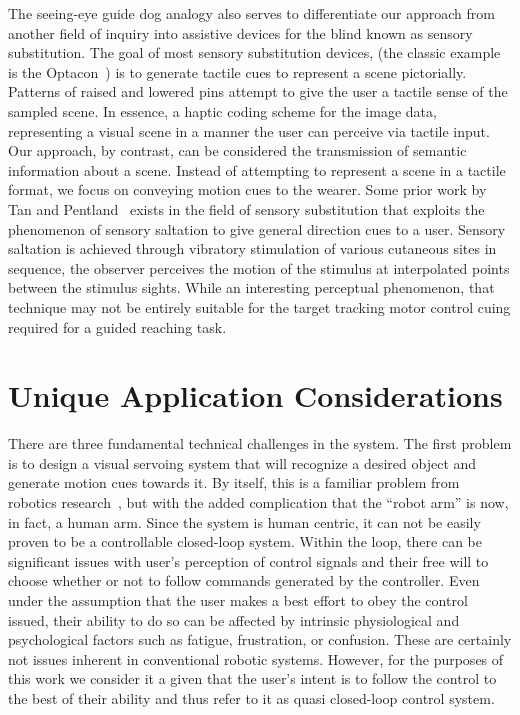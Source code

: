 The seeing-eye guide dog analogy also serves to differentiate our approach from another field of inquiry into assistive devices for the blind known as sensory substitution.  The goal of most sensory substitution devices, (the classic example is the Optacon~\cite{Bib:Linvill}) is to generate tactile cues to represent a scene pictorially.  Patterns of raised and lowered pins attempt to give the user a tactile sense of the sampled scene.  In essence, a haptic coding scheme for the image data, representing a visual scene in a manner the user can perceive via tactile input.  Our approach, by contrast, can be considered the transmission of semantic information about a scene. Instead of attempting to represent a scene in a tactile format, we focus on conveying motion cues to the wearer.  Some prior work by Tan and Pentland~\cite{TAN97, TAN05} exists in the field of sensory substitution that exploits the phenomenon of sensory saltation to give general direction cues to a user. Sensory saltation is achieved through vibratory stimulation of various cutaneous sites in sequence, the observer perceives the motion of the stimulus at interpolated points between the stimulus sights. While an interesting perceptual phenomenon, that technique may not be entirely suitable for the target tracking motor control cuing required for a guided reaching task.

\section{Unique Application Considerations}\label{ch:Introduction:sec:UniqueApp}

There are three fundamental technical challenges in the system.  The first problem is to design a visual servoing system that will
recognize a desired object and generate motion cues towards it.  By itself, this is a familiar problem from robotics research~\cite{Bib:Corke, Bib:Hutchinson}, but with the added complication that the ``robot arm'' is now, in fact, a human arm.  Since the system is human centric, it can not be easily proven to be a controllable closed-loop system.  Within the loop, there can be significant issues with user's perception of control signals and their free will to choose whether or not to follow commands generated by the controller.  Even under the assumption that the user makes a best effort to obey the control issued, their ability to do so can be affected by intrinsic physiological and psychological factors such as fatigue, frustration, or confusion.  These are certainly not issues inherent in conventional robotic systems.  However, for the purposes of this work we consider it a given that the user's intent is to follow the control to the best of their ability and thus refer to it as quasi closed-loop control system.

